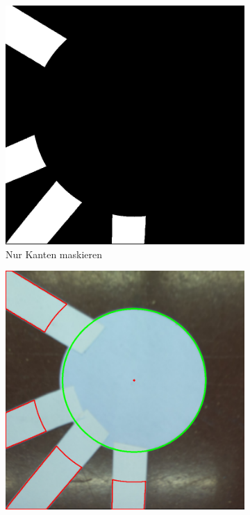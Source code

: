 \begin{enumerate}
\begin{figure}[H]
\begin{subfigure}{0.4\textwidth}
        \includegraphics[width=0.95\linewidth]{assets/informatik-prototyp/opencv/angle_detection/edge_masked.png} 
        \caption{Nur Kanten maskieren}
        \label{fig:edge-masked}
        \end{subfigure}
        \begin{subfigure}{0.4\textwidth}
        \includegraphics[width=0.95\linewidth]{assets/informatik-prototyp/opencv/angle_detection/edge_contours.png} 

\end{subfigure}
\end{figure}
\end{enumerate}
